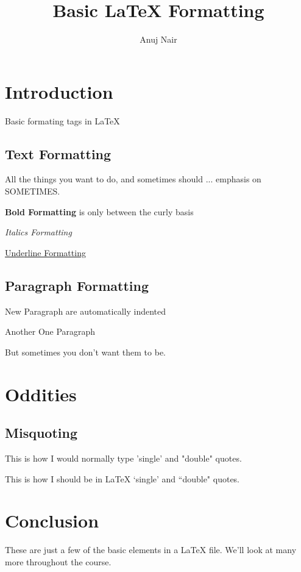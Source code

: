 \documentclass{article}
\title{Basic {\LaTeX} Formatting}
\author{Anuj Nair}
\date{}
\begin{document}
\maketitle

\section{Introduction}

Basic formating tags in \LaTeX

\subsection{Text Formatting}

All the things you want to do, and sometimes should ... emphasis on SOMETIMES. 

\textbf{Bold Formatting} is only between the curly basis

\emph{Italics Formatting}

\underline{Underline Formatting}

\subsection{Paragraph Formatting}

New Paragraph are automatically indented

Another  One Paragraph

\noindent But sometimes you don't want them to be.

\section{Oddities}

\subsection{Misquoting}

This is how I would normally type 'single' and "double" quotes.

\noindent This is how I should be in {\LaTeX} `single' and ``double" quotes.

\section{Conclusion}

These are just a few of the basic elements in a {\LaTeX} file. We'll look at many more throughout the course.
\end{document}
